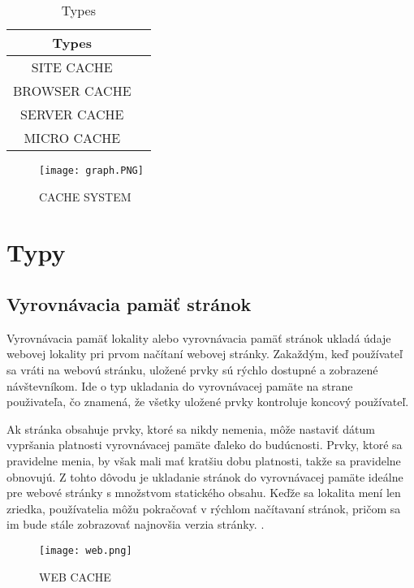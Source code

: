 \documentclass[10pt,oneside,slovak,a4paper]{article}
\begin{document}
\begin{table}[H]
\centering
\begin{tabular}{|c|c|}
\hline
    \textbf{Types} \\
     \hline
     SITE CACHE  \\
     \hline
     BROWSER CACHE  \\
     \hline
     SERVER CACHE  \\
     \hline
     MICRO CACHE  \\
    \hline
\end{tabular}
\caption{Types\cite{OCEAN}}
\label{fig:tab1}
\end{table}


\begin{figure}[H]
\centering
\texttt{[image: graph.PNG]}
\caption{CACHE SYSTEM\cite{IEEE}}
\label{fig:diag2}
\end{figure}

\section{Typy}

\subsection{Vyrovnávacia pamäť stránok}
\quad
Vyrovnávacia pamäť lokality alebo vyrovnávacia pamäť stránok ukladá údaje webovej lokality pri prvom načítaní webovej stránky. Zakaždým, keď používateľ
sa vráti na  webovú stránku, uložené prvky sú rýchlo dostupné a zobrazené návštevníkom. Ide o typ ukladania do vyrovnávacej pamäte na strane použivateľa, čo znamená, že všetky uložené prvky kontroluje koncový používateľ.

Ak stránka obsahuje prvky, ktoré sa nikdy nemenia, môže nastaviť dátum vypršania platnosti vyrovnávacej pamäte ďaleko do budúcnosti. Prvky, ktoré sa pravidelne menia, by však mali mať kratšiu dobu platnosti, takže sa pravidelne obnovujú. Z tohto dôvodu je ukladanie stránok do vyrovnávacej pamäte ideálne pre webové stránky s množstvom statického obsahu. Keďže sa  lokalita mení len zriedka, používatelia môžu pokračovať v rýchlom načítavaní  stránok, pričom sa im bude stále zobrazovať najnovšia verzia stránky. .
\begin{figure}[H]
\centering
\texttt{[image: web.png]}
\caption{WEB CACHE\cite{CHECK}}
\label{fig:diag}
\end{figure}
\end{document}
